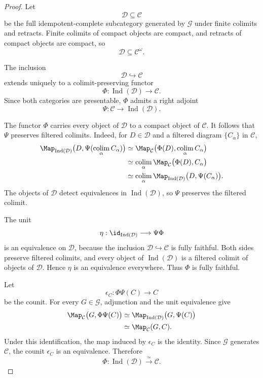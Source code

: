\begin{proof}
Let
\[
    \mathcal D\subseteq\mathcal C
\]
be the full idempotent-complete subcategory generated by \(\mathcal G\) under
finite colimits and retracts.  Finite colimits of compact objects are compact,
and retracts of compact objects are compact, so
\[
    \mathcal D\subseteq\mathcal C^\omega.
\]

The inclusion
\[
    \mathcal D\hookrightarrow\mathcal C
\]
extends uniquely to a colimit-preserving functor
\[
    \Phi:
    \operatorname{Ind}(\mathcal D)
    \longrightarrow
    \mathcal C.
\]
Since both categories are presentable, \(\Phi\) admits a right adjoint
\[
    \Psi:
    \mathcal C
    \longrightarrow
    \operatorname{Ind}(\mathcal D).
\]

The functor \(\Phi\) carries every object of \(\mathcal D\) to a compact
object of \(\mathcal C\).  It follows that \(\Psi\) preserves filtered
colimits.  Indeed, for \(D\in\mathcal D\) and a filtered diagram
\(\{C_\alpha\}\) in \(\mathcal C\),
\[
\begin{aligned}
    \Map_{\operatorname{Ind}(\mathcal D)}
    \bigl(
      D,\Psi(\operatorname*{colim}_\alpha C_\alpha)
    \bigr)
    &\simeq
    \Map_{\mathcal C}
    \bigl(
      \Phi(D),\operatorname*{colim}_\alpha C_\alpha
    \bigr) \\
    &\simeq
    \operatorname*{colim}_\alpha
    \Map_{\mathcal C}
    \bigl(
      \Phi(D),C_\alpha
    \bigr) \\
    &\simeq
    \operatorname*{colim}_\alpha
    \Map_{\operatorname{Ind}(\mathcal D)}
    \bigl(
      D,\Psi(C_\alpha)
    \bigr).
\end{aligned}
\]
The objects of \(\mathcal D\) detect equivalences in
\(\operatorname{Ind}(\mathcal D)\), so \(\Psi\) preserves the filtered
colimit.

The unit
\[
    \eta:
    \id_{\operatorname{Ind}(\mathcal D)}
    \longrightarrow
    \Psi\Phi
\]
is an equivalence on \(\mathcal D\), because the inclusion
\(\mathcal D\hookrightarrow\mathcal C\) is fully faithful.  Both sides
preserve filtered colimits, and every object of
\(\operatorname{Ind}(\mathcal D)\) is a filtered colimit of objects of
\(\mathcal D\).  Hence \(\eta\) is an equivalence everywhere.  Thus
\(\Phi\) is fully faithful.

Let
\[
    \epsilon_C:
    \Phi\Psi(C)
    \longrightarrow
    C
\]
be the counit.  For every \(G\in\mathcal G\), adjunction and the unit
equivalence give
\[
\begin{aligned}
    \Map_{\mathcal C}
    \bigl(
      G,\Phi\Psi(C)
    \bigr)
    &\simeq
    \Map_{\operatorname{Ind}(\mathcal D)}
    \bigl(
      G,\Psi(C)
    \bigr) \\
    &\simeq
    \Map_{\mathcal C}(G,C).
\end{aligned}
\]
Under this identification, the map induced by \(\epsilon_C\) is the identity.
Since \(\mathcal G\) generates \(\mathcal C\), the counit \(\epsilon_C\) is an
equivalence.  Therefore
\[
    \Phi:
    \operatorname{Ind}(\mathcal D)
    \xrightarrow{\simeq}
    \mathcal C.
\]


\end{proof}
